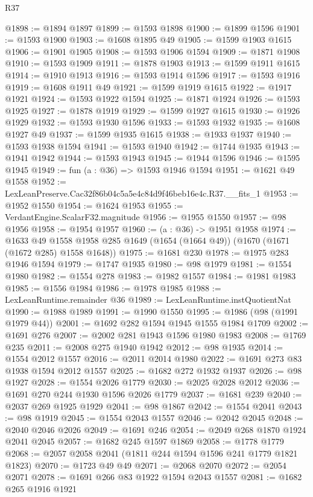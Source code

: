 \begin{lexlean}{R37}
\begin{coremodule}
@1898 := @1894 @1897
@1899 := @1593 @1898
@1900 := @1899 @1596
@1901 := @1593 @1900
@1903 := @1608 @1895 @49
@1905 := @1599 @1903 @1615
@1906 := @1901 @1905
@1908 := @1593 @1906 @1594
@1909 := @1871 @1908
@1910 := @1593 @1909
@1911 := @1878 @1903
@1913 := @1599 @1911 @1615
@1914 := @1910 @1913
@1916 := @1593 @1914 @1596
@1917 := @1593 @1916
@1919 := @1608 @1911 @49
@1921 := @1599 @1919 @1615
@1922 := @1917 @1921
@1924 := @1593 @1922 @1594
@1925 := @1871 @1924
@1926 := @1593 @1925
@1927 := @1878 @1919
@1929 := @1599 @1927 @1615
@1930 := @1926 @1929
@1932 := @1593 @1930 @1596
@1933 := @1593 @1932
@1935 := @1608 @1927 @49
@1937 := @1599 @1935 @1615
@1938 := @1933 @1937
@1940 := @1593 @1938 @1594
@1941 := @1593 @1940
@1942 := @1744 @1935
@1943 := @1941 @1942
@1944 := @1593 @1943
@1945 := @1944 @1596
@1946 := @1595 @1945
@1949 := fun (a : @36) => @1593 @1946 @1594
@1951 := @1621 @49 @1558
@1952 := LexLeanPreserve.Cac32f86b04c5a5e4c84d9f46beb16e4c.R37.__fits_1
@1953 := @1952 @1550
@1954 := @1624 @1953
@1955 := VerdantEngine.ScalarF32.magnitude
@1956 := @1955 @1550
@1957 := @98 @1956
@1958 := @1954 @1957
@1960 := (a : @36) -> @1951 @1958
@1974 := @1633
    @49
    @1558
    @1958
    @285
    @1649
    (@1654 (@1664 @49))
    (@1670 (@1671 (@1672 @285) @1558 @1648))
@1975 := @1681 @230
@1978 := @1975 @283 @1946 @1594
@1979 := @1747 @1935
@1980 := @98 @1979
@1981 := @1554 @1980
@1982 := @1554 @278
@1983 := @1982 @1557
@1984 := @1981 @1983
@1985 := @1556 @1984
@1986 := @1978 @1985
@1988 := LexLeanRuntime.remainder @36
@1989 := LexLeanRuntime.instQuotientNat
@1990 := @1988 @1989
@1991 := @1990 @1550
@1995 := @1986 (@98 (@1991 @1979 @44))
@2001 := @1692 @282 @1594 @1945 @1555 @1984 @1709
@2002 := @1691 @276
@2007 := @2002 @281 @1943 @1596 @1980 @1983
@2008 := @1769 @235
@2011 := @2008 @275 @1940 @1942
@2012 := @98 @1935
@2014 := @1554 @2012 @1557
@2016 := @2011 @2014 @1980
@2022 := @1691 @273 @83 @1938 @1594 @2012 @1557
@2025 := @1682 @272 @1932 @1937
@2026 := @98 @1927
@2028 := @1554 @2026 @1779
@2030 := @2025 @2028 @2012
@2036 := @1691 @270 @244 @1930 @1596 @2026 @1779
@2037 := @1681 @239
@2040 := @2037 @269 @1925 @1929
@2041 := @98 @1867
@2042 := @1554 @2041
@2043 := @98 @1919
@2045 := @1554 @2043 @1557
@2046 := @2042 @2045
@2048 := @2040 @2046 @2026
@2049 := @1691 @246
@2054 := @2049 @268 @1870 @1924 @2041 @2045
@2057 := @1682 @245 @1597 @1869
@2058 := @1778 @1779
@2068 := @2057 @2058 @2041 (@1811 @244 @1594 @1596 @241 @1779 @1821 @1823)
@2070 := @1723 @49 @49
@2071 := @2068 @2070
@2072 := @2054 @2071
@2078 := @1691 @266 @83 @1922 @1594 @2043 @1557
@2081 := @1682 @265 @1916 @1921

\end{coremodule}
\end{lexlean}
